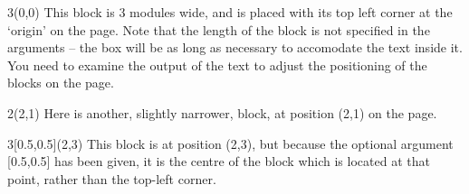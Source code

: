 \documentclass{article}
\begin{document}
\begin{textblock}{3}(0,0)
This block is 3 modules wide, and is placed with its top left corner
at the `origin' on the page.  Note that the length of the block is not
specified in the arguments -- the box will be as long as necessary to
accomodate the text inside it.  You need to examine the output of the
text to adjust the positioning of the blocks on the page.
\end{textblock}

\begin{textblock}{2}(2,1)
Here is another, slightly narrower, block, at position (2,1) on the page.
\end{textblock}

\begin{textblock}{3}[0.5,0.5](2,3)
This block is at position (2,3), but because the optional argument
[0.5,0.5] has been given, it is the centre of the block which is
located at that point, rather than the top-left corner.
\end{textblock}
\end{document}
